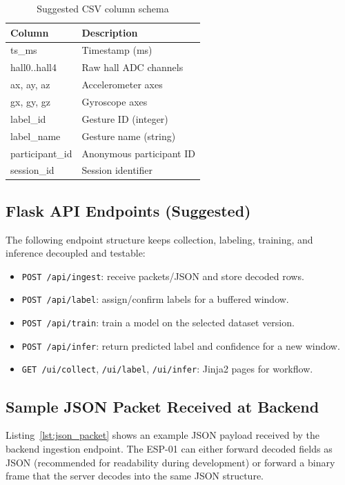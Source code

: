 \documentclass[conference]{IEEEtran}
\begin{document}
\begin{table}[htbp]
    \centering
    \caption{Suggested CSV column schema}
    \begin{tabularx}{\columnwidth}{@{}lX@{}}
        \toprule
        Column & Description \\
        \midrule
        ts\_ms & Timestamp (ms) \\
        hall0..hall4 & Raw hall ADC channels \\
        ax, ay, az & Accelerometer axes \\
        gx, gy, gz & Gyroscope axes \\
        label\_id & Gesture ID (integer) \\
        label\_name & Gesture name (string) \\
        participant\_id & Anonymous participant ID \\
        session\_id & Session identifier \\
        \bottomrule
    \end{tabularx}
    \label{tab:csvschema}
\end{table}

\subsection{Flask API Endpoints (Suggested)}
The following endpoint structure keeps collection, labeling, training, and inference decoupled and testable:
\begin{itemize}[noitemsep]
    \item \texttt{POST /api/ingest}: receive packets/JSON and store decoded rows.
    \item \texttt{POST /api/label}: assign/confirm labels for a buffered window.
    \item \texttt{POST /api/train}: train a model on the selected dataset version.
    \item \texttt{POST /api/infer}: return predicted label and confidence for a new window.
    \item \texttt{GET /ui/collect}, \texttt{/ui/label}, \texttt{/ui/infer}: Jinja2 pages for workflow.
\end{itemize}

\subsection{Sample JSON Packet Received at Backend}
Listing~\ref{lst:json_packet} shows an example JSON payload received by the backend ingestion endpoint. The ESP-01 can either forward decoded fields as JSON (recommended for readability during development) or forward a binary frame that the server decodes into the same JSON structure.
\end{document}
